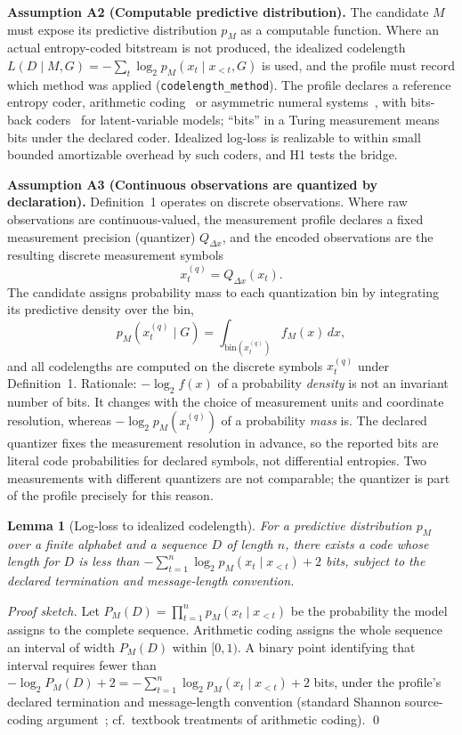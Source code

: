 \documentclass[11pt]{article}
\newtheorem{lemma}{Lemma}
\begin{document}
\textbf{Assumption A2 (Computable predictive distribution).} The candidate \(M\) must expose its predictive distribution \(p_M\) as a computable function. Where an actual entropy-coded bitstream is not produced, the idealized codelength \(L(D\mid M,G)=-\sum_t \log_2 p_M(x_t\mid x_{<t},G)\) is used, and the profile must record which method was applied (\texttt{codelength\_method}). The profile declares a reference entropy coder, arithmetic coding~\cite{witten1987} or asymmetric numeral systems~\cite{duda2009}, with bits-back coders~\cite{hinton1993,townsend2019} for latent-variable models; ``bits'' in a Turing measurement means bits under the declared coder. Idealized log-loss is realizable to within small bounded amortizable overhead by such coders, and H1 tests the bridge.

\textbf{Assumption A3 (Continuous observations are quantized by declaration).} Definition~1 operates on discrete observations. Where raw observations are continuous-valued, the measurement profile declares a fixed measurement precision (quantizer) \(Q_{\Delta x}\), and the encoded observations are the resulting discrete measurement symbols
\[
x_t^{(q)} = Q_{\Delta x}(x_t).
\]
The candidate assigns probability mass to each quantization bin by integrating its predictive density over the bin,
\[
p_M(x_t^{(q)}\mid G) = \int_{\mathrm{bin}(x_t^{(q)})} f_M(x)\,dx,
\]
and all codelengths are computed on the discrete symbols \(x_t^{(q)}\) under Definition~1. Rationale: \(-\log_2 f(x)\) of a probability \textit{density} is not an invariant number of bits. It changes with the choice of measurement units and coordinate resolution, whereas \(-\log_2 p_M(x_t^{(q)})\) of a probability \textit{mass} is. The declared quantizer fixes the measurement resolution in advance, so the reported bits are literal code probabilities for declared symbols, not differential entropies. Two measurements with different quantizers are not comparable; the quantizer is part of the profile precisely for this reason.

\begin{lemma}[Log-loss to idealized codelength]
For a predictive distribution \(p_M\) over a finite alphabet and a sequence \(D\) of length \(n\), there exists a code whose length for \(D\) is less than \(-\sum_{t=1}^{n}\log_2 p_M(x_t\mid x_{<t}) + 2\) bits, subject to the declared termination and message-length convention.
\end{lemma}
\textit{Proof sketch.} Let \(P_M(D)=\prod_{t=1}^{n}p_M(x_t\mid x_{<t})\) be the probability the model assigns to the complete sequence. Arithmetic coding assigns the whole sequence an interval of width \(P_M(D)\) within \([0,1)\). A binary point identifying that interval requires fewer than \(-\log_2 P_M(D)+2 = -\sum_{t=1}^{n}\log_2 p_M(x_t\mid x_{<t})+2\) bits, under the profile's declared termination and message-length convention (standard Shannon source-coding argument~\cite{shannon1948}; cf.\ textbook treatments of arithmetic coding). \qed
\end{document}
